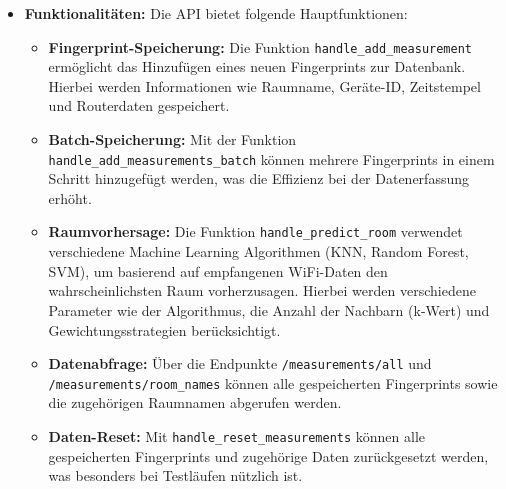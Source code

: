 \begin{itemize}
    \item \textbf{Funktionalitäten:} Die API bietet folgende Hauptfunktionen:
        \begin{itemize}
            \item \textbf{Fingerprint-Speicherung:} Die Funktion \texttt{handle\_add\_measurement} ermöglicht das Hinzufügen eines neuen Fingerprints zur Datenbank. Hierbei werden Informationen wie Raumname, Geräte-ID, Zeitstempel und Routerdaten gespeichert.
            \item \textbf{Batch-Speicherung:} Mit der Funktion \texttt{handle\_add\_measurements\_batch} können mehrere Fingerprints in einem Schritt hinzugefügt werden, was die Effizienz bei der Datenerfassung erhöht.
            \item \textbf{Raumvorhersage:} Die Funktion \texttt{handle\_predict\_room} verwendet verschiedene Machine Learning Algorithmen (KNN, Random Forest, SVM), um basierend auf empfangenen WiFi-Daten den wahrscheinlichsten Raum vorherzusagen. Hierbei werden verschiedene Parameter wie der Algorithmus, die Anzahl der Nachbarn (k-Wert) und Gewichtungsstrategien berücksichtigt.
            \item \textbf{Datenabfrage:} Über die Endpunkte \texttt{/measurements/all} und \texttt{/measurements/room\_names} können alle gespeicherten Fingerprints sowie die zugehörigen Raumnamen abgerufen werden.
            \item \textbf{Daten-Reset:} Mit \texttt{handle\_reset\_measurements} können alle gespeicherten Fingerprints und zugehörige Daten zurückgesetzt werden, was besonders bei Testläufen nützlich ist.
        \end{itemize}


\end{itemize}
